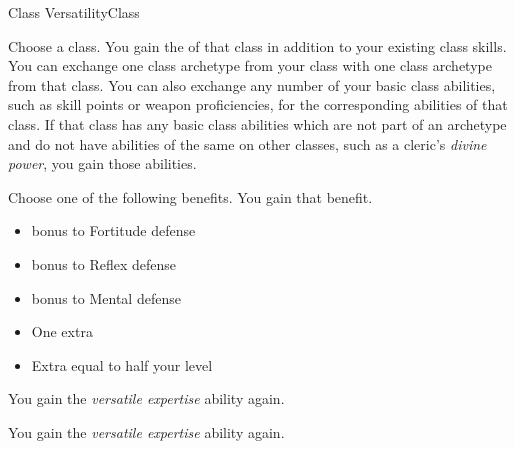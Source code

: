     \begin{feat}{Class Versatility}{Class}

         Choose a class.
        You gain the  of that class in addition to your existing class skills.
        You can exchange one class archetype from your class with one class archetype from that class.
        You can also exchange any number of your basic class abilities, such as skill points or weapon proficiencies, for the corresponding abilities of that class.
        If that class has any basic class abilities which are not part of an archetype and do not have abilities of the same on other classes, such as a cleric's \textit{divine power}, you gain those abilities.

         Choose one of the following benefits.
        You gain that benefit.
        \begin{itemize}
            \item {} bonus to Fortitude defense
            \item {} bonus to Reflex defense
            \item {} bonus to Mental defense
            \item One extra 
            \item Extra  equal to half your level
        \end{itemize}

         You gain the \textit{versatile expertise} ability again.

         You gain the \textit{versatile expertise} ability again.
    \end{feat}

